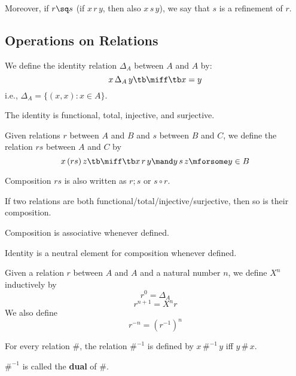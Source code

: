 Moreover, if $r\sq s$ (if $x\,r\,y$, then also $x\,s\,y$), we say that $s$ is a refinement of $r$.

\subsection{Operations on Relations}

\begin{definition}[Identity]\label{def:math:reliden}
We define the identity relation $\Delta_A$ between $A$ and $A$ by: 
\[x\,\Delta_A\,y \tb\miff\tb x=y\]
i.e., $\Delta_A=\{(x,x):x\in A\}$.
\end{definition}

\begin{theorem}[Identity]\label{thm:math:reliden}
The identity is functional, total, injective, and surjective.
\end{theorem}

\begin{definition}[Composition]\label{def:math:relcomp}
Given relations $r$ between $A$ and $B$ and $s$ between $B$ and $C$, we define the relation $rs$ between $A$ and $C$ by
\[x\,(rs)\,z \tb\miff\tb x\,r\,y \mand y\,s\,z \mforsome y\in B\]
\end{definition}

Composition $rs$ is also written as $r;s$ or $s\circ r$.

\begin{theorem}[Composition]\label{thm:math:relcomp}
If two relations are both functional/total/injective/surjective, then so is their composition.
\end{theorem}

\begin{theorem}\label{def:math:relcat}
Composition is associative whenever defined.

Identity is a neutral element for composition whenever defined.
\end{theorem}

\begin{definition}[Powers]\label{def:math:relcomp}
Given a relation $r$ between $A$ and $A$ and a natural number $n$, we define $X^n$ inductively by
\[r^0=\Delta_A\]
\[r^{n+1}=X^n r\]
We also define
\[r^{-n}=(r^{-1})^n\]
\end{definition}

\begin{definition}\label{def:math:reldual}
For every relation $\#$, the relation $\#^{-1}$ is defined by $x\,\#^{-1}\, y$ iff $y\,\#\,x$.

$\#^{-1}$ is called the \textbf{dual} of $\#$.
\end{definition}

